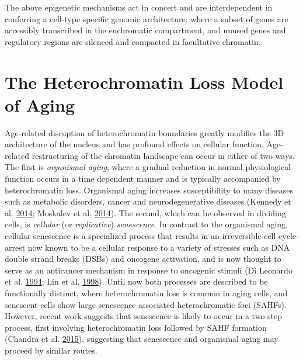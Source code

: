 \documentclass[onehalf,12pt]{beavtex}
\begin{document}
  The above epigenetic mechanisms act in concert and are interdependent in
  conferring a cell-type specific genomic architecture; where a subset of
  genes are accessibly transcribed in the euchromatic compartment, and
  unused genes and regulatory regions are silenced and compacted in
  facultative chromatin.
  
  \section{The Heterochromatin Loss Model of
  Aging}\label{the-heterochromatin-loss-model-of-aging}
  
  Age-related disruption of heterochromatin boundaries greatly modifies
  the 3D architecture of the nucleus and has profound effects on cellular
  function. Age-related restructuring of the chromatin landscape can occur
  in either of two ways. The first is \emph{organismal aging}, where a
  gradual reduction in normal physiological function occurs in a time
  dependent manner and is typically accompanied by heterochromatin loss.
  Organismal aging increases susceptibility to many diseases such as
  metabolic disorders, cancer and neurodegenerative diseases (Kennedy et
  al. \protect\hyperlink{ref-KennedyGerosciencelinkingaging2014}{2014};
  Moskalev et al.
  \protect\hyperlink{ref-MoskalevGeneticsepigeneticsaging2014}{2014}). The
  second, which can be observed in dividing cells, is \emph{cellular} (or
  \emph{replicative}) \emph{senescence}. In contrast to the organismal
  aging, cellular senescence is a specialized process that results in an
  irreversible cell cycle-arrest now known to be a cellular response to a
  variety of stresses such as DNA double strand breaks (DSBs) and oncogene
  activation, and is now thought to serve as an anticancer mechanism in
  response to oncogenic stimuli (Di Leonardo et al.
  \protect\hyperlink{ref-DiLeonardoDNAdamagetriggers1994}{1994}; Lin et
  al. \protect\hyperlink{ref-LinPrematuresenescenceinvolving1998}{1998}).
  Until now both processes are described to be functionally distinct,
  where heterochromatin loss is common in aging cells, and senescent cells
  show large senescence associated heterochromatic foci (SAHFs). However,
  recent work suggests that senescence is likely to occur in a two step
  process, first involving heterochromatin loss followed by SAHF formation
  (Chandra et al.
  \protect\hyperlink{ref-ChandraGlobalReorganizationNuclear2015}{2015}),
  suggesting that senescence and organismal aging may proceed by similar
  routes.
  
\end{document}
